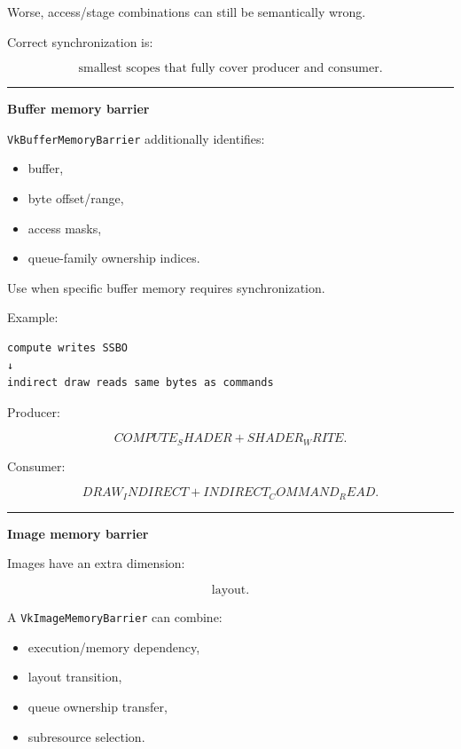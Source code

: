 Worse, access/stage combinations can still be semantically wrong.

Correct synchronization is:

\[
\boxed{
\text{smallest scopes that fully cover producer and consumer}.
}
\]

\begin{center}\rule{0.5\linewidth}{0.5pt}\end{center}

\textbf{Buffer memory barrier}

\texttt{VkBufferMemoryBarrier} additionally identifies:

\begin{itemize}
\tightlist
\item
  buffer,
\item
  byte offset/range,
\item
  access masks,
\item
  queue-family ownership indices.
\end{itemize}

Use when specific buffer memory requires synchronization.

Example:

\begin{verbatim}
compute writes SSBO
↓
indirect draw reads same bytes as commands
\end{verbatim}

Producer:

\[
COMPUTE_SHADER
+
SHADER_WRITE.
\]

Consumer:

\[
DRAW_INDIRECT
+
INDIRECT_COMMAND_READ.
\]

\begin{center}\rule{0.5\linewidth}{0.5pt}\end{center}

\textbf{Image memory barrier}

Images have an extra dimension:

\[
\boxed{\text{layout}.}
\]

A \texttt{VkImageMemoryBarrier} can combine:

\begin{itemize}
\tightlist
\item
  execution/memory dependency,
\item
  layout transition,
\item
  queue ownership transfer,
\item
  subresource selection.
\end{itemize}

